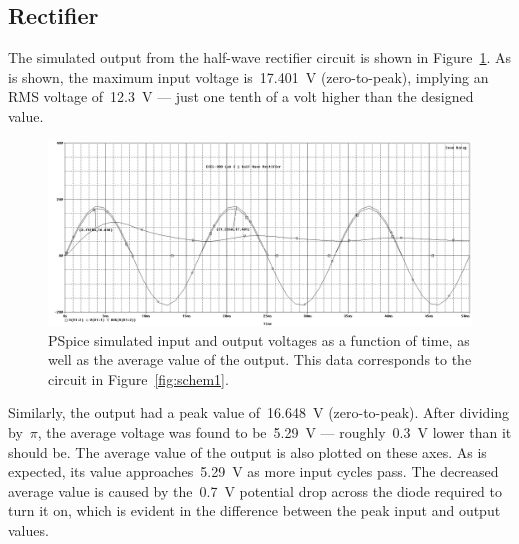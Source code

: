 \newcommand{\pwidth}{.95\textwidth}
\subsection{Rectifier}
The simulated output from the half-wave rectifier circuit is shown in
Figure~\ref{fig:halfwavePlotV}.  As is shown, the maximum input voltage
is~\SI{17.401}{\volt} (zero-to-peak), implying an RMS voltage
of~\SI{12.3}{\volt} --- just one tenth of a volt higher than the designed value.
%
\begin{figure}[H]
	\centering
	\includegraphics[width=\pwidth]{img/plot/halfwavePlot.PNG}
	\parbox{\pwidth}{
	\caption[PSpice Plot --- Half-wave Rectifier (Voltage)]{PSpice simulated
		input and output voltages as a function of time, as well as the average
		value of the output.  This data corresponds to the circuit in
		Figure~\ref{fig:schem1}.}
	\label{fig:halfwavePlotV}}
\end{figure}
%
Similarly, the output had a peak value of~\SI{16.648}{\volt} (zero-to-peak).
After dividing by~$\pi$, the average voltage was found to be~\SI{5.29}{\volt}
--- roughly~\SI{0.3}{\volt} lower than it should be.  The average value of the
output is also plotted on these axes.  As is expected, its value
approaches~\SI{5.29}{\volt} as more input cycles pass.  The decreased average
value is caused by the~\SI{0.7}{\volt} potential drop across the diode required
to turn it on, which is evident in the difference between the peak input and
output values.

